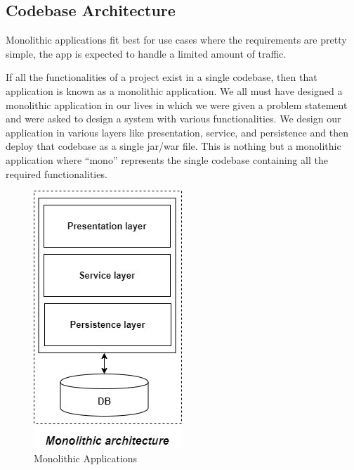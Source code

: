 \subsection{Codebase Architecture}
Monolithic applications fit best for use cases where the requirements are pretty simple, the app is expected to handle a limited amount of traffic. 

If all the functionalities of a project exist in a single codebase, then that application is known as a monolithic application. We all must have designed a monolithic application in our lives in which we were given a problem statement and were asked to design a system with various functionalities. We design our application in various layers like presentation, service, and persistence and then deploy that codebase as a single jar/war file. This is nothing but a monolithic application where “mono” represents the single codebase containing all the required functionalities.
\begin{figure}[!ht]
      \center
      \includegraphics[scale=0.50]{assets/monolithic.jpg}
      \caption{Monolithic Applications}
      \label{fig:monoapp}
\end{figure}

